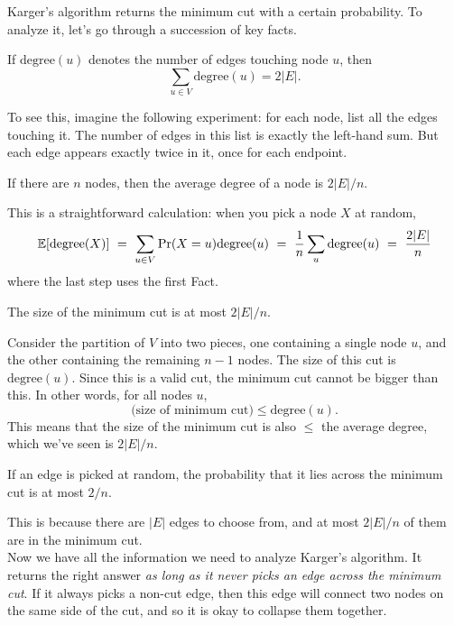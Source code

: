 Karger's algorithm returns the minimum cut with a certain probability. To analyze it,
let's go through a succession of key facts.

\begin{fact}
If $\mbox{degree}(u)$ denotes the number of edges touching node $u$, then
$$ \sum_{u \in V} \mbox{degree}(u) = 2|E|.$$
\end{fact}
To see this, imagine the following experiment: for each node, list all the edges touching 
it. The number of edges in this list is exactly the left-hand sum. But each edge appears 
exactly twice in it, once for each endpoint.

\begin{fact}
If there are $n$ nodes, then the average degree of a node is $2|E|/n$.
\end{fact}
This is a straightforward calculation: when you pick a node $X$ at random,
$$ 
\E[\mbox{degree}(X)] 
\ = \ 
\sum_{u \in V} \pr(X = u) \mbox{degree}(u) 
\ = \ 
\frac{1}{n} \sum_u \mbox{degree}(u) 
\ = \ 
\frac{2|E|}{n}
$$
where the last step uses the first Fact.

\begin{fact}
The size of the minimum cut is at most $2|E|/n$.
\end{fact}
Consider the partition of $V$ into two pieces, one containing a single node $u$, and the 
other containing the remaining $n-1$ nodes. The size of this cut is $\mbox{degree}(u)$.
Since this is a valid cut, the minimum cut cannot be bigger than this. In other words,
for all nodes $u$,
$$ \mbox{(size of minimum cut)} \leq \mbox{degree}(u) .$$
This means that the size of the minimum cut is also $\leq$ the average degree, which 
we've seen is $2|E|/n$.

\begin{fact}
If an edge is picked at random, the probability that it lies across the minimum cut is 
at most $2/n$.
\end{fact}
This is because there are $|E|$ edges to choose from, and at most $2|E|/n$ of them are
in the minimum cut.
\\

Now we have all the information we need to analyze Karger's algorithm. It returns the
right answer {\it as long as it never picks an edge across the minimum cut}. If it always 
picks a non-cut edge, then this edge will connect two nodes on the same side of the cut,
and so it is okay to collapse them together.

